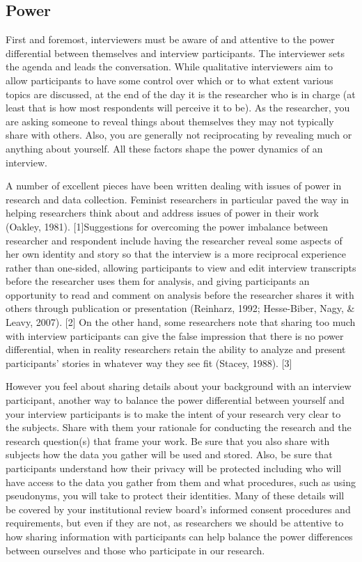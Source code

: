 \subsection{Power}

First and foremost, interviewers must be aware of and attentive to the power differential between themselves and interview participants. The interviewer sets the agenda and leads the conversation. While qualitative interviewers aim to allow participants to have some control over which or to what extent various topics are discussed, at the end of the day it is the researcher who is in charge (at least that is how most respondents will perceive it to be). As the researcher, you are asking someone to reveal things about themselves they may not typically share with others. Also, you are generally not reciprocating by revealing much or anything about yourself. All these factors shape the power dynamics of an interview.

A number of excellent pieces have been written dealing with issues of power in research and data collection. Feminist researchers in particular paved the way in helping researchers think about and address issues of power in their work (Oakley, 1981). [1]Suggestions for overcoming the power imbalance between researcher and respondent include having the researcher reveal some aspects of her own identity and story so that the interview is a more reciprocal experience rather than one-sided, allowing participants to view and edit interview transcripts before the researcher uses them for analysis, and giving participants an opportunity to read and comment on analysis before the researcher shares it with others through publication or presentation (Reinharz, 1992; Hesse-Biber, Nagy, \& Leavy, 2007). [2] On the other hand, some researchers note that sharing too much with interview participants can give the false impression that there is no power differential, when in reality researchers retain the ability to analyze and present participants’ stories in whatever way they see fit (Stacey, 1988). [3]

However you feel about sharing details about your background with an interview participant, another way to balance the power differential between yourself and your interview participants is to make the intent of your research very clear to the subjects. Share with them your rationale for conducting the research and the research question(s) that frame your work. Be sure that you also share with subjects how the data you gather will be used and stored. Also, be sure that participants understand how their privacy will be protected including who will have access to the data you gather from them and what procedures, such as using pseudonyms, you will take to protect their identities. Many of these details will be covered by your institutional review board’s informed consent procedures and requirements, but even if they are not, as researchers we should be attentive to how sharing information with participants can help balance the power differences between ourselves and those who participate in our research.


